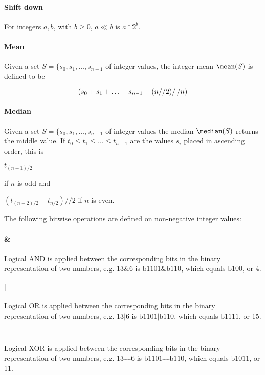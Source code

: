 \paragraph*{Shift down} For integers $a,b$, with $b\geq 0$, $a\ll b$ is $a*2^b$.

\paragraph*{Mean} Given a set  $S=\{s_0, s_1, \hdots, s_{n-1}$ of integer values, the integer mean $\mean(S)$ is defined
to be

\[\left( s_0+s_1+\hdots +s_{n-1}+(n//2)\right //n)\]

\paragraph*{Median} Given a set $S=\{s_0, s_1, \hdots, s_{n-1}$ of integer values the median $\median(S)$ 
returns the middle value. If $t_0\leq t_1\leq \hdots \leq t_{n-1}$ are the values $s_i$ placed in ascending order, this
is 

$t_{(n-1)/2}$ 

if $n$ is odd and

$(t_{(n-2)/2}+t_{n/2})//2$ if $n$ is even.

The following bitwise operations are defined on non-negative integer values:
\paragraph*{\&} Logical AND is applied between the corresponding bits in the binary representation of two numbers, e.g.
$13\&6$ is $\text{b1101}\&\text{b110}$, which equals $\text{b100}$, or 4.

\paragraph*{$\mathbf{|}$} Logical OR is applied between the corresponding bits in the binary representation of two numbers, e.g.
$13|6$ is $\text{b1101}\text{|}\text{b110}$, which equals $\text{b1111}$, or 15.

\paragraph*{\Large$\hat\quad$} Logical XOR is applied between the corresponding bits in the binary representation of two numbers, e.g.
$13\hat\quad 6$ is $\text{b1101}\hat\quad\text{b110}$, which equals $\text{b1011}$, or 11.

